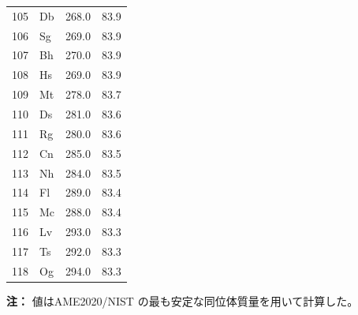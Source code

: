 \documentclass[12pt,a4paper]{article}
\begin{document}
\begin{longtable}{c l c c}
		105& Db  & 268.0  & 83.9 \\
		106& Sg  & 269.0  & 83.9 \\
		107& Bh  & 270.0  & 83.9 \\
		108& Hs  & 269.0  & 83.9 \\
		109& Mt  & 278.0  & 83.7 \\
		110& Ds  & 281.0  & 83.6 \\
		111& Rg  & 280.0  & 83.6 \\
		112& Cn  & 285.0  & 83.5 \\
		113& Nh  & 284.0  & 83.5 \\
		114& Fl  & 289.0  & 83.4 \\
		115& Mc  & 288.0  & 83.4 \\
		116& Lv  & 293.0  & 83.3 \\
		117& Ts  & 292.0  & 83.3 \\
		118& Og  & 294.0  & 83.3 \\
		\bottomrule
	\end{longtable}
	\vspace{0.5cm}
	\textbf{注：} 値はAME2020/NIST の最も安定な同位体質量を用いて計算した。
	
\end{document}
